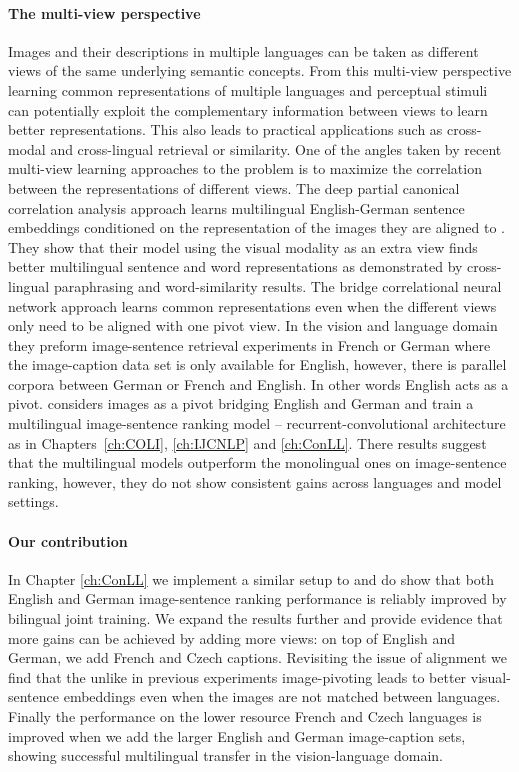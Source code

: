 \paragraph{The multi-view perspective}

Images and their descriptions in multiple languages can be taken as different views of the
same underlying semantic concepts. From this multi-view perspective learning common representations
of multiple languages and perceptual stimuli can potentially exploit the complementary information
between views to learn better representations. This also leads to practical applications such as
cross-modal and cross-lingual retrieval or similarity.
One of the angles taken by recent multi-view learning approaches to the problem
is to maximize the correlation between the representations of different views.
The deep partial canonical correlation
analysis approach learns multilingual English-German sentence embeddings conditioned on the
representation of the images they are aligned to \citep{rotman2018bridging}.
They show that their model using the visual modality as an extra view finds
better multilingual sentence and word representations as demonstrated by
cross-lingual paraphrasing and word-similarity results.
The bridge correlational neural network approach \citep{rajendran2015bridge}
learns common representations even when the different views only need to be
aligned with one pivot view. In the vision and language domain they preform
image-sentence retrieval experiments in French or German where
the image-caption data set is only available for English, however,
there is parallel corpora between German or French and English. In other words English acts as a pivot.
\cite{gella2017image} considers images as a pivot bridging English and German and train a multilingual
image-sentence ranking model -- recurrent-convolutional architecture as in Chapters~\ref{ch:COLI}, \ref{ch:IJCNLP} and \ref{ch:ConLL}.
There results suggest that the multilingual models outperform the monolingual ones on image-sentence
ranking, however, they do not show consistent gains across languages and model settings.

\paragraph{Our contribution}

In Chapter \ref{ch:ConLL} we implement a similar setup to \cite{gella2017image}
and do show that both English and German image-sentence
ranking performance is reliably improved by bilingual joint training.
We expand the results further and provide evidence that more gains can be
achieved by adding more views: on top of English and German, we
add French and Czech captions. Revisiting the issue of alignment we find that
the unlike in previous experiments \citep{gella2017image,calixto2017multilingual,rotman2018bridging}
image-pivoting leads to better visual-sentence embeddings even when the images
are not matched between languages. Finally the performance on the lower resource
French and Czech languages is improved when we add the larger
English and German image-caption sets, showing successful multilingual
transfer in the vision-language domain.

